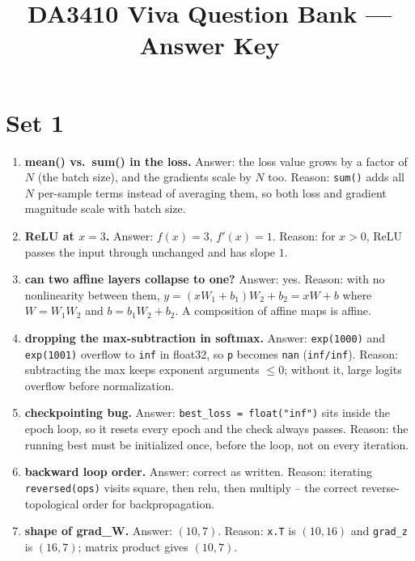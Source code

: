 \documentclass[11pt]{article}
\title{\LARGE DA3410 Viva Question Bank --- Answer Key}
\author{}
\date{}
\begin{document}
\maketitle
\thispagestyle{fancy}

\section*{Set 1}
\begin{enumerate}

\item \textbf{mean() vs.\ sum() in the loss.}
Answer: the loss value grows by a factor of $N$ (the batch size), and the
gradients scale by $N$ too.
Reason: \texttt{sum()} adds all $N$ per-sample terms instead of averaging
them, so both loss and gradient magnitude scale with batch size.

\item \textbf{ReLU at $x=3$.}
Answer: $f(x)=3$, $f'(x)=1$.
Reason: for $x>0$, ReLU passes the input through unchanged and has slope $1$.

\item \textbf{can two affine layers collapse to one?}
Answer: yes.
Reason: with no nonlinearity between them, $y=(xW_1+b_1)W_2+b_2=xW+b$ where
$W=W_1W_2$ and $b=b_1W_2+b_2$. A composition of affine maps is affine.

\item \textbf{dropping the max-subtraction in softmax.}
Answer: \texttt{exp(1000)} and \texttt{exp(1001)} overflow to \texttt{inf}
in float32, so \texttt{p} becomes \texttt{nan} (\texttt{inf/inf}).
Reason: subtracting the max keeps exponent arguments $\le 0$; without it,
large logits overflow before normalization.

\item \textbf{checkpointing bug.}
Answer: \texttt{best\_loss = float("inf")} sits inside the epoch loop, so it
resets every epoch and the check always passes.
Reason: the running best must be initialized once, before the loop, not on
every iteration.

\item \textbf{backward loop order.}
Answer: correct as written.
Reason: iterating \texttt{reversed(ops)} visits square, then relu, then
multiply -- the correct reverse-topological order for backpropagation.

\item \textbf{shape of grad\_W.}
Answer: $(10,7)$.
Reason: \texttt{x.T} is $(10,16)$ and \texttt{grad\_z} is $(16,7)$; matrix
product gives $(10,7)$.


\end{enumerate}
\end{document}

